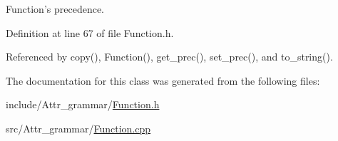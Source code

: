 Function's precedence. 



Definition at line 67 of file Function.h.



Referenced by copy(), Function(), get\_\-prec(), set\_\-prec(), and to\_\-string().



The documentation for this class was generated from the following files:\begin{DoxyCompactItemize}
\item 
include/Attr\_\-grammar/\hyperlink{Function_8h}{Function.h}\item 
src/Attr\_\-grammar/\hyperlink{Function_8cpp}{Function.cpp}\end{DoxyCompactItemize}
